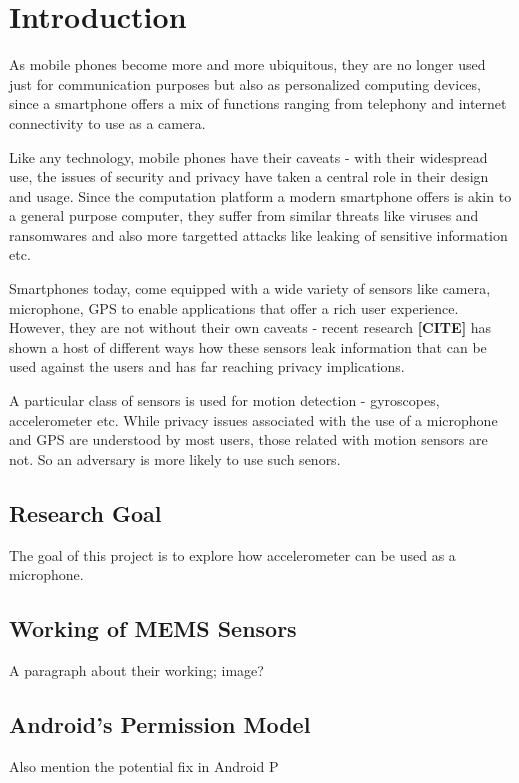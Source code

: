 \chapter{Introduction}

As mobile phones become more and more ubiquitous, they are no longer used just for communication purposes but also as personalized computing devices, since a smartphone offers a mix of functions ranging from telephony and internet connectivity to use as a camera.

Like any technology, mobile phones have their caveats - with their widespread use, the issues of security and privacy have taken a central role in their design and usage. Since the computation platform a modern smartphone offers is akin to a general purpose computer, they suffer from similar threats like viruses and ransomwares and also more targetted attacks like leaking of sensitive information etc.

Smartphones today, come equipped with a wide variety of sensors like camera, microphone, GPS to enable applications that offer a rich user experience. However, they are not without their own caveats - recent research
\textbf{[CITE]} has shown a host of different ways how these sensors leak information that can be used against the users and has far reaching privacy implications.

A particular class of sensors is used for motion detection - gyroscopes, accelerometer etc. While privacy issues associated with the use of a microphone and GPS are understood by most users, those related with motion sensors are not. So an adversary is more likely to use such senors.


\section{Research Goal}

\begin{adjustwidth}{1cm}{1cm}
The goal of this project is to explore how accelerometer can be used as a microphone.
\end{adjustwidth}

\section{Working of MEMS Sensors}
A paragraph about their working; image?


\section{Android's Permission Model}
Also mention the potential fix in Android P

\lipsum[2]

